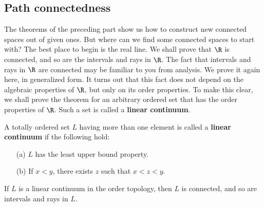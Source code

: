 \subsection{Path connectedness}
The theorems of the preceding part show us how to construct new connected spaces out of given ones. But where can we find some connected spaces to start with? The best place to begin is the real line. We shall prove that $\R$ is connected, and so are the intervals and rays in $\R$.
The fact that intervals and rays in $\R$ are connected may be familiar to you from analysis. We prove it again here, in generalized form. It turns out that this fact does not depend on the algebraic properties of $\R$, but only on its order properties. To make this clear, we shall prove the theorem for an arbitrary ordered set that has the order properties of $\R$. Such a set is called a \textbf{linear continuum}.
\begin{definition}
A totally ordered set $L$ having more than one element is called a \textbf{linear continuum} if the following hold:
\begin{itemize}
\item[(a)] $L$ has the least upper bound property.
\item[(b)] If $x<y$, there exists $z$ such that $x<z<y$.
\end{itemize}
\end{definition}
\begin{theorem}
If $L$ is a linear continuum in the order topology, then $L$ is connected, and so are intervals and rays in $L$.
\end{theorem}

